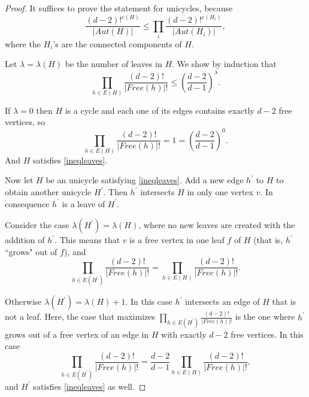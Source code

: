 \documentclass[11pt,notitlepage,a4paper]{article}
\theoremstyle{definition}
\begin{document}
\begin{proof}
	It suffices to prove the statement for unicycles, because
	 \[ \frac{(d-2)!^{e(H)}}{|Aut(H)|}\leq \prod_{i} \frac{(d-2)!^{e(H_i)}}{|Aut(H_i)|}, \]
	where the $H_i$'s are the connected components of $H$.\par
	Let $\lambda=\lambda(H)$ be the number of 
	leaves in $H$. We show by induction that
	\begin{equation}\label{ineqleaves}
	\prod_{h\in E(H)} \frac{(d-2)!}{|Free(h)|!} \leq 
	\left(\frac{d-2}{d-1}\right)^\lambda.
	\end{equation}
	\par
	If $\lambda=0$ then $H$ is a cycle and each one of
	its edges contains exactly $d-2$ free vertices, so
	\[	\prod_{h\in E(H)} \frac{(d-2)!}{|Free(h)|!}=1=
	\left(\frac{d-2}{d-1}\right)^0.\]
	And $H$ satisfies \cref{ineqleaves}.
	\par
	Now let $H$ be an unicycle satisfying 
	\cref{ineqleaves}. Add a new edge $h^\prime$ to $H$ 
	to obtain another unicycle $H^\prime$. Then 
	$h^\prime$ intersects $H$ in only one vertex $v$. 
	In consequence $h^\prime$ is a leave of $H^\prime$.
	\par
	Consider the case $\lambda(H^\prime)=\lambda(H)$,
	where no new leaves are created with the addition of
	$h^\prime$. This means that $v$ is a free vertex in one
	leaf $f$ of $H$ (that is, $h^\prime$ ``grows" out of $f$), 
	and
	\[	\prod_{h\in E(H^\prime)} \frac{(d-2)!}{|Free(h)|!}=
	\prod_{h\in E(H)} \frac{(d-2)!}{|Free(h)|!}.\]
	\par
	Otherwise $\lambda(H^\prime)=\lambda(H)+1$. In this case
	$h^\prime$ intersects an edge of $H$ that is not a leaf.
	Here, the case that maximizes $\prod_{h\in E(H^\prime)} 
	\frac{(d-2)!}{|Free(h)|!}$ is the one where $h^\prime$ grows out  
	of a free vertex of an edge in $H$ with exactly
	$d-2$ free vertices. In this case
	\[	\prod_{h\in E(H^\prime)} \frac{(d-2)!}{|Free(h)|!}=
	\frac{d-2}{d-1} \prod_{h\in E(H)} 
	\frac{(d-2)!}{|Free(h)|!},\]
	and $H^\prime$ satisfies \cref{ineqleaves} as well.\par

\end{proof}
\end{document}
